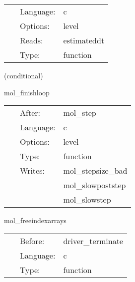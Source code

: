 \hspace{5mm}{\it control the step size: set the new timestep } 


\hspace{5mm}

 \begin{tabular*}{160mm}{cll} 
~ & Language:  & c \\ 
~ & Options:  & level \\ 
~ & Reads:  & estimateddt \\ 
~ & Type:  & function \\ 
\end{tabular*} 


\vspace{5mm}

   (conditional) 

\hspace{5mm} mol\_finishloop 

\hspace{5mm}{\it control the step size } 


\hspace{5mm}

 \begin{tabular*}{160mm}{cll} 
~ & After:  & mol\_step \\ 
~ & Language:  & c \\ 
~ & Options:  & level \\ 
~ & Type:  & function \\ 
~ & Writes:  & mol\_stepsize\_bad \\ 
~& ~ &mol\_slowpoststep\\ 
~& ~ &mol\_slowstep\\ 
\end{tabular*} 


\vspace{5mm}


\hspace{5mm} mol\_freeindexarrays 

\hspace{5mm}{\it free the mol bookkeeping index arrays } 


\hspace{5mm}

 \begin{tabular*}{160mm}{cll} 
~ & Before:  & driver\_terminate \\ 
~ & Language:  & c \\ 
~ & Type:  & function \\ 
\end{tabular*} 


